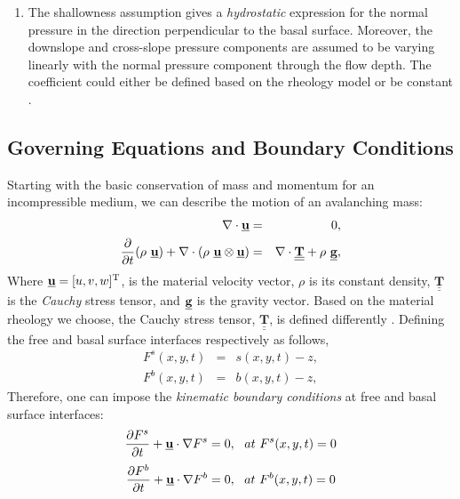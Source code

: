 \documentclass{article}
\def\dt{\partial t}
\begin{document}
\begin{enumerate}
\item The shallowness assumption gives a \textit{hydrostatic} expression for the normal pressure in the direction perpendicular to the basal surface. Moreover, the downslope and cross-slope pressure components are assumed to be varying linearly with the normal pressure component through the flow depth. The coefficient could either be defined based on the rheology model or be constant \citep{SavageHutter,Bartelt1999,Iverson2001,Denlinger2001}.
\end{enumerate}
\subsection{Governing Equations and Boundary Conditions}\label{subsec:GovEqsBCs}
Starting with the basic conservation of mass and momentum for an incompressible medium, we can describe the motion of an avalanching mass:
\begin{eqnarray}\label{eq:N_S}
\nabla \cdot\underline{{\textbf u}} &=& 0, \nonumber \\
\dfrac{\partial}{\dt}(\rho \ \underline{{\textbf u}})+\nabla \cdot (\rho \ \underline{{\textbf u}}\otimes \underline{{\textbf u}}) &=& \nabla \cdot \underline{\underline{{\mathbf{T}}}}+\rho \ \underline{{\textbf g}},
\end{eqnarray}
Where $\underline{{\textbf u}}=[u, v, w]^{\mathrm{T}}$, is the material velocity vector, $\rho$ is its constant density, $\underline{\underline{{\mathbf{T}}}}$ is the \textit{Cauchy} stress tensor, and $\underline{{\textbf g}}$ is the gravity vector. Based on the material rheology we choose, the Cauchy stress tensor, $\underline{\underline{{\mathbf{T}}}}$, is defined differently \citep{FreundtBursik1998}. Defining the free and basal surface interfaces respectively as follows,
\begin{eqnarray}\label{eq:surfacesDefs}
F^s(x,y,t) &=& s(x,y,t)-z, \nonumber \\
F^b(x,y,t) &=& b(x,y,t)-z,
\end{eqnarray}
Therefore, one can impose the \textit{kinematic boundary conditions} at free and basal surface interfaces:
\begin{equation}\label{eq:SurKinBC}
\frac{\partial F^s}{\dt} + \underline{{\textbf u}}\cdot\nabla F^s = 0, \ \ at \ F^s(x,y,t)=0
\end{equation}
\begin{equation}\label{eq:BedKinBC}
\frac{\partial F^b}{\dt} + \underline{{\textbf u}}\cdot\nabla F^b = 0, \ \ at \ F^b(x,y,t)=0
\end{equation}
\end{document}
